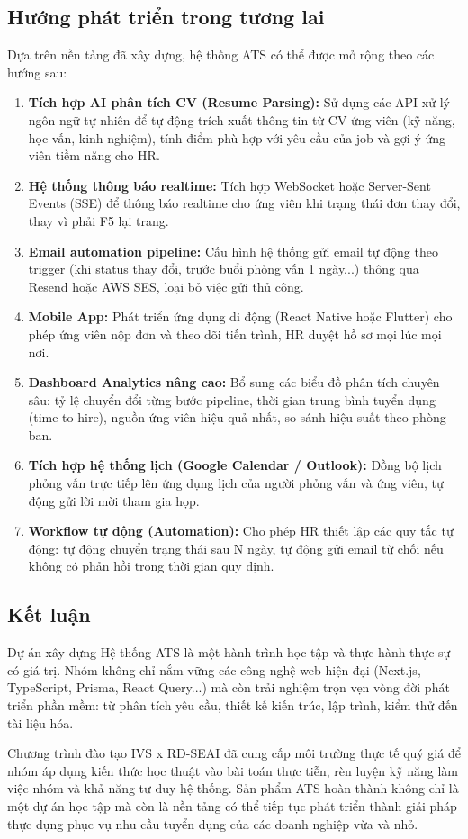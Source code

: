 \subsection{Hướng phát triển trong tương lai}
Dựa trên nền tảng đã xây dựng, hệ thống ATS có thể được mở rộng theo các hướng sau:

\begin{enumerate}
    \item \textbf{Tích hợp AI phân tích CV (Resume Parsing):} Sử dụng các API xử lý ngôn ngữ tự nhiên để tự động trích xuất thông tin từ CV ứng viên (kỹ năng, học vấn, kinh nghiệm), tính điểm phù hợp với yêu cầu của job và gợi ý ứng viên tiềm năng cho HR.

    \item \textbf{Hệ thống thông báo realtime:} Tích hợp WebSocket hoặc Server-Sent Events (SSE) để thông báo realtime cho ứng viên khi trạng thái đơn thay đổi, thay vì phải F5 lại trang.

    \item \textbf{Email automation pipeline:} Cấu hình hệ thống gửi email tự động theo trigger (khi status thay đổi, trước buổi phỏng vấn 1 ngày...) thông qua Resend hoặc AWS SES, loại bỏ việc gửi thủ công.

    \item \textbf{Mobile App:} Phát triển ứng dụng di động (React Native hoặc Flutter) cho phép ứng viên nộp đơn và theo dõi tiến trình, HR duyệt hồ sơ mọi lúc mọi nơi.

    \item \textbf{Dashboard Analytics nâng cao:} Bổ sung các biểu đồ phân tích chuyên sâu: tỷ lệ chuyển đổi từng bước pipeline, thời gian trung bình tuyển dụng (time-to-hire), nguồn ứng viên hiệu quả nhất, so sánh hiệu suất theo phòng ban.

    \item \textbf{Tích hợp hệ thống lịch (Google Calendar / Outlook):} Đồng bộ lịch phỏng vấn trực tiếp lên ứng dụng lịch của người phỏng vấn và ứng viên, tự động gửi lời mời tham gia họp.

    \item \textbf{Workflow tự động (Automation):} Cho phép HR thiết lập các quy tắc tự động: tự động chuyển trạng thái sau N ngày, tự động gửi email từ chối nếu không có phản hồi trong thời gian quy định.
\end{enumerate}

\subsection{Kết luận}
Dự án xây dựng Hệ thống ATS là một hành trình học tập và thực hành thực sự có giá trị. Nhóm không chỉ nắm vững các công nghệ web hiện đại (Next.js, TypeScript, Prisma, React Query...) mà còn trải nghiệm trọn vẹn vòng đời phát triển phần mềm: từ phân tích yêu cầu, thiết kế kiến trúc, lập trình, kiểm thử đến tài liệu hóa.

Chương trình đào tạo IVS x RD-SEAI đã cung cấp môi trường thực tế quý giá để nhóm áp dụng kiến thức học thuật vào bài toán thực tiễn, rèn luyện kỹ năng làm việc nhóm và khả năng tư duy hệ thống. Sản phẩm ATS hoàn thành không chỉ là một dự án học tập mà còn là nền tảng có thể tiếp tục phát triển thành giải pháp thực dụng phục vụ nhu cầu tuyển dụng của các doanh nghiệp vừa và nhỏ.

